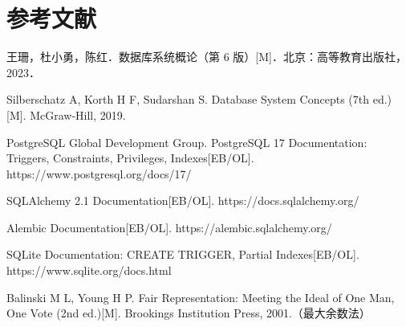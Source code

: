 \section*{参考文献}
\begin{enumerate}[label={[\arabic*]},leftmargin=2.5em]
  \item 王珊，杜小勇，陈红．数据库系统概论（第 6 版）[M]．北京：高等教育出版社，2023．
  \item Silberschatz A, Korth H F, Sudarshan S. Database System Concepts (7th ed.)[M]. McGraw-Hill, 2019.
  \item PostgreSQL Global Development Group. PostgreSQL 17 Documentation: Triggers, Constraints, Privileges, Indexes[EB/OL]. https://www.postgresql.org/docs/17/
  \item SQLAlchemy 2.1 Documentation[EB/OL]. https://docs.sqlalchemy.org/
  \item Alembic Documentation[EB/OL]. https://alembic.sqlalchemy.org/
  \item SQLite Documentation: CREATE TRIGGER, Partial Indexes[EB/OL]. https://www.sqlite.org/docs.html
  \item Balinski M L, Young H P. Fair Representation: Meeting the Ideal of One Man, One Vote (2nd ed.)[M]. Brookings Institution Press, 2001.（最大余数法）
\end{enumerate}
